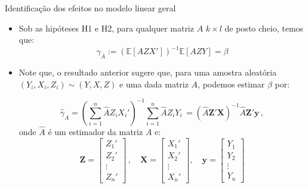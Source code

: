 \documentclass[11pt]{beamer}
\begin{document}
\begin{frame}{Identificação dos efeitos no modelo linear geral}
\begin{itemize}
	\item Sob as hipóteses H1 e H2, {\color{red}para qualquer matriz $A$ $k\times l$} de posto cheio, temos que:
	$$ \gamma_A := (\mathbb{E}[AZX'])^{-1}\mathbb{E}[AZY] = \beta$$
	\item Note que, o resultado anterior sugere que, para uma amostra aleatória $(Y_i,X_i, Z_i)\sim (Y,X,Z)$ e uma dada matriz $A$, podemos estimar $\beta$ por:
	
	$$\hat{\gamma}_A = \left(\sum_{i=1}^n \hat{A} Z_i X_i'\right)^{-1}\sum_{i=1}^n \hat{A} Z_i Y_i\, = (\hat{A} \boldsymbol{Z}'\boldsymbol{X})^{-1}\hat{A} \boldsymbol{Z}' \boldsymbol{y}\, ,$$
	onde $\hat{A}$ é um estimador da matriz $A$ e:
	$$\boldsymbol{Z} = \begin{bmatrix}
		Z_1' \\
		Z_2' \\
		\vdots \\
		Z_n'
	\end{bmatrix}\, , \quad \boldsymbol{X} = \begin{bmatrix}
	X_1' \\
	X_2' \\
	\vdots \\
	X_n'
	\end{bmatrix}, \quad \boldsymbol{y} =\begin{bmatrix}
	Y_1\\
	Y_2\\
	\vdots \\
	Y_n
	\end{bmatrix}$$
\end{itemize}

\end{frame}
\end{document}
